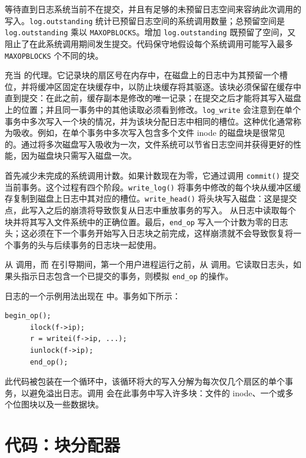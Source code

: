  等待直到日志系统当前不在提交，并且有足够的未预留日志空间来容纳此次调用的写入。\lstinline{log.outstanding} 统计已预留日志空间的系统调用数量；总预留空间是 \lstinline{log.outstanding} 乘以 \lstinline{MAXOPBLOCKS}。增加 \lstinline{log.outstanding} 既预留了空间，又阻止了在此系统调用期间发生提交。代码保守地假设每个系统调用可能写入最多 \lstinline{MAXOPBLOCKS} 个不同的块。

 充当  的代理。它记录块的扇区号在内存中，在磁盘上的日志中为其预留一个槽位，并将缓冲区固定在块缓存中，以防止块缓存将其驱逐。该块必须保留在缓存中直到提交：在此之前，缓存副本是修改的唯一记录；在提交之后才能将其写入磁盘上的位置；并且同一事务中的其他读取必须看到修改。\lstinline{log_write} 会注意到在单个事务中多次写入一个块的情况，并为该块分配日志中相同的槽位。这种优化通常称为吸收。例如，在单个事务中多次写入包含多个文件 inode 的磁盘块是很常见的。通过将多次磁盘写入吸收为一次，文件系统可以节省日志空间并获得更好的性能，因为磁盘块只需写入磁盘一次。

 首先减少未完成的系统调用计数。如果计数现在为零，它通过调用 \lstinline{commit()} 提交当前事务。这个过程有四个阶段。\lstinline{write_log()} 将事务中修改的每个块从缓冲区缓存复制到磁盘上日志中其对应的槽位。\lstinline{write_head()} 将头块写入磁盘：这是提交点，此写入之后的崩溃将导致恢复从日志中重放事务的写入。 从日志中读取每个块并将其写入文件系统中的正确位置。最后，\lstinline{end_op} 写入一个计数为零的日志头；这必须在下一个事务开始写入日志块之前完成，这样崩溃就不会导致恢复将一个事务的头与后续事务的日志块一起使用。

 从  调用，而  在引导期间，第一个用户进程运行之前，从  调用。它读取日志头，如果头指示日志包含一个已提交的事务，则模拟 \lstinline{end_op} 的操作。

日志的一个示例用法出现在  中。事务如下所示：
\begin{lstlisting}[]
      begin_op();
      ilock(f->ip);
      r = writei(f->ip, ...);
      iunlock(f->ip);
      end_op();
\end{lstlisting}
此代码被包装在一个循环中，该循环将大的写入分解为每次仅几个扇区的单个事务，以避免溢出日志。调用  会在此事务中写入许多块：文件的 inode、一个或多个位图块以及一些数据块。
\section{代码：块分配器}

